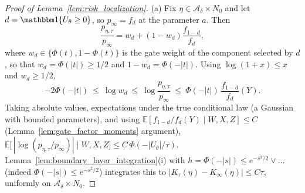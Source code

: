 \documentclass[11pt]{article}
\theoremstyle{definition}
\theoremstyle{plain}
\newcommand{\E}{\mathbb{E}}
\begin{document}
\begin{proof}[Proof of Lemma~\ref{lem:risk_localization}]
(a) Fix $\eta\in\mathcal A_\delta\times N_0$ and let $d=\mathbbm 1\{U_\theta\ge0\}$, so $p_\infty=f_d$ at the parameter $a$. Then
\[
\frac{p_{\eta,\tau}}{p_\infty}=w_d+(1-w_d)\frac{f_{1-d}}{f_d},
\]
where $w_d\in\{\Phi(t),1-\Phi(t)\}$ is the gate weight of the component selected by $d$, so that $w_d=\Phi(|t|)\ge1/2$ and $1-w_d=\Phi(-|t|)$. Using $\log(1+x)\le x$ and $w_d\ge1/2$,
\[
-2\Phi(-|t|)\ \le\ \log w_d\ \le\ \log\frac{p_{\eta,\tau}}{p_\infty}\ \le\ \Phi(-|t|)\,\frac{f_{1-d}}{f_d}(Y).
\]
Taking absolute values, expectations under the true conditional law (a Gaussian with bounded parameters), and using $\E[f_{1-d}/f_d(Y)\mid W,X,Z]\le C$ (Lemma~\ref{lem:gate_factor_moments} argument),
$\E\big[\,|\log(p_{\eta,\tau}/p_\infty)|\;\big|\;W,X,Z\big]\le C\,\Phi(-|U_\theta|/\tau)$.
Lemma~\ref{lem:boundary_layer_integration}(i) with $h=\Phi(-|s|)\le e^{-s^2/2}\vee\ldots$ (indeed $\Phi(-|s|)\le e^{-s^2/2}$) integrates this to $|K_\tau(\eta)-K_\infty(\eta)|\le C\tau$, uniformly on $\mathcal A_\delta\times N_0$.


\end{proof}
\end{document}
